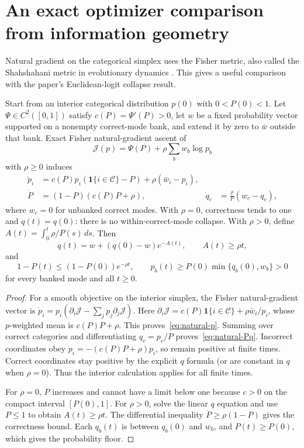 \section{An exact optimizer comparison from information geometry}
\label{sec:natural-gradient}
Natural gradient on the categorical simplex uses the Fisher metric, also
called the Shahshahani metric in evolutionary dynamics
\cite[Sections~2.3 and 3.1]{harper2009}. This gives a useful comparison with
the paper's Euclidean-logit collapse result.

\begin{proposition}
\label{prop:natural-replay}
Start from an interior categorical distribution $p(0)$ with
$0<P(0)<1$. Let $\Psi\in C^2([0,1])$ satisfy
$c(P)=\Psi'(P)>0$, let $w$ be a fixed probability vector supported on a
nonempty correct-mode bank, and extend it by zero to $\bar w$ outside that
bank. Exact Fisher natural-gradient ascent of
\[
 \mathcal J(p)=\Psi(P)+\rho\sum_b w_b\log p_b
\]
with $\rho\ge0$ induces
\begin{align}
 \dot p_i&=c(P)p_i(\mathbf1\{i\in\mathcal C\}-P)
             +\rho(\bar w_i-p_i),\label{eq:natural-p}\\
 \dot P&=(1-P)(c(P)P+\rho),&
 \dot q_c&=\frac{\rho}{P}(w_c-q_c),\label{eq:natural-Pq}
\end{align}
where $w_c=0$ for unbanked correct modes. With $\rho=0$, correctness tends
to one and $q(t)=q(0)$: there is no within-correct-mode collapse.
With $\rho>0$, define $A(t)=\int_0^t\rho/P(s)\,ds$. Then
\[
 q(t)=w+(q(0)-w)e^{-A(t)},\qquad A(t)\ge\rho t,
\]
and
\[
 1-P(t)\le(1-P(0))e^{-\rho t},\qquad
 p_b(t)\ge P(0)\min\{q_b(0),w_b\}>0
\]
for every banked mode and all $t\ge0$.
\end{proposition}
\begin{proof}
For a smooth objective on the interior simplex, the Fisher natural-gradient
vector is $\dot p_i=p_i(\partial_i\mathcal J-
\sum_jp_j\partial_j\mathcal J)$. Here
$\partial_i\mathcal J=c(P)\mathbf1\{i\in\mathcal C\}+
\rho\bar w_i/p_i$, whose $p$-weighted mean is $c(P)P+\rho$.
This proves~\eqref{eq:natural-p}. Summing over correct categories and
differentiating $q_c=p_c/P$ proves~\eqref{eq:natural-Pq}.
Incorrect coordinates obey $\dot p_i=-(c(P)P+\rho)p_i$, so remain positive
at finite times. Correct coordinates stay positive by the explicit
$q$ formula (or are constant in $q$ when $\rho=0$). Thus the interior
calculation applies for all finite times.

For $\rho=0$, $P$ increases and cannot have a limit below one because
$c>0$ on the compact interval $[P(0),1]$. For $\rho>0$, solve the linear
$q$ equation and use $P\le1$ to obtain $A(t)\ge\rho t$.
The differential inequality $\dot P\ge\rho(1-P)$ gives the correctness
bound. Each $q_b(t)$ is between $q_b(0)$ and $w_b$, and $P(t)\ge P(0)$,
which gives the probability floor.
\end{proof}

